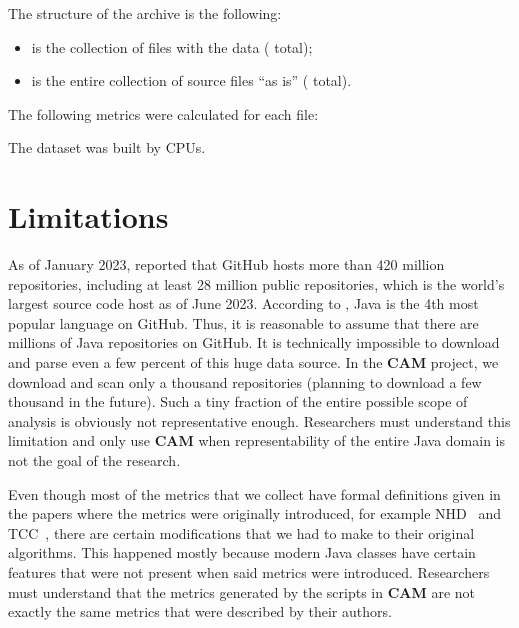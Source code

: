 \documentclass[sigplan,nonacm,review,anonymous]{acmart}
\newcommand\cam{{\sffamily\bfseries CAM}}
\begin{document}
The structure of the archive is the following:

\begin{itemize}

  \item {} is the collection of  files with the data
  (\unskip{} total);

  \item {} is the entire collection of
  \unskip{}
  source files ``as is''
  (\unskip{} total).

\end{itemize}

The following
\unskip{}
metrics were
calculated for each  file:

\begin{itemize}
  
\end{itemize}

The dataset was built by
\unskip{}
CPUs\unskip{}.

\section{Limitations}\label{sec:limitations}

As of January 2023, \citet{dohmke2023} reported that GitHub hosts more than
420 million repositories, including at least 28 million public repositories,
which is the world's largest source code host as of June 2023. According
to \citep{daigle2023}, Java is the 4th most popular language on GitHub. Thus,
it is reasonable to assume that there are millions of Java repositories on
GitHub. It is technically impossible to download and parse even a few percent
of this huge data source. In the \cam{} project, we download and scan only a
thousand repositories (planning to download a few thousand in the future).
Such a tiny fraction of the entire possible scope of analysis is obviously
not representative enough. Researchers must understand this limitation and
only use \cam{} when representability of the entire Java domain is not the
goal of the research.

Even though most of the metrics that we collect have formal definitions
given in the papers where the metrics were originally introduced,
for example NHD~\citep{counsell2006interpretation} and
TCC~\citep{bieman1995cohesion}, there are certain modifications
that we had to make to their original algorithms. This happened mostly
because modern Java classes have certain features that were not present
when said metrics were introduced. Researchers must understand that
the metrics generated by the scripts in \cam{} are not exactly the same
metrics that were described by their authors.
\end{document}

